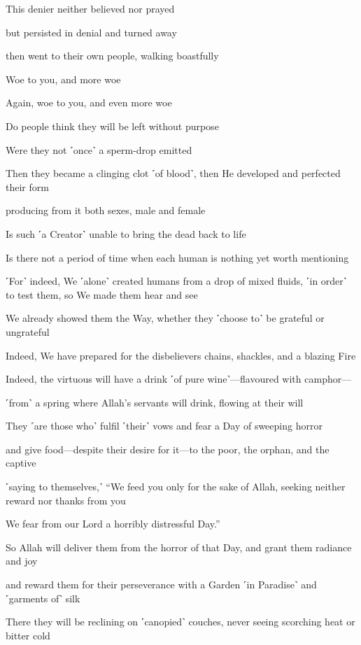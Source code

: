 This denier neither believed nor prayed

but persisted in denial and turned away

then went to their own people, walking boastfully

Woe to you, and more woe

Again, woe to you, and even more woe

Do people think they will be left without purpose

Were they not ˹once˺ a sperm-drop emitted

Then they became a clinging clot ˹of blood˺, then He developed and perfected their form

producing from it both sexes, male and female

Is such ˹a Creator˺ unable to bring the dead back to life

Is there not a period of time when each human is nothing yet worth mentioning

˹For˺ indeed, We ˹alone˺ created humans from a drop of mixed fluids, ˹in order˺ to test them, so We made them hear and see

We already showed them the Way, whether they ˹choose to˺ be grateful or ungrateful

Indeed, We have prepared for the disbelievers chains, shackles, and a blazing Fire

Indeed, the virtuous will have a drink ˹of pure wine˺—flavoured with camphor—

˹from˺ a spring where Allah’s servants will drink, flowing at their will

They ˹are those who˺ fulfil ˹their˺ vows and fear a Day of sweeping horror

and give food—despite their desire for it—to the poor, the orphan, and the captive

˹saying to themselves,˺ “We feed you only for the sake of Allah, seeking neither reward nor thanks from you

We fear from our Lord a horribly distressful Day.”

So Allah will deliver them from the horror of that Day, and grant them radiance and joy

and reward them for their perseverance with a Garden ˹in Paradise˺ and ˹garments of˺ silk

There they will be reclining on ˹canopied˺ couches, never seeing scorching heat or bitter cold

